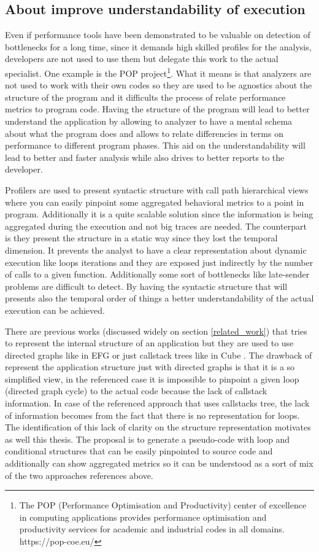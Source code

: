 \subsection{About improve understandability of execution}

Even if performance tools have been demonstrated to be valuable on detection of
bottlenecks for a long time, since it demands high skilled profiles for the
analysis, developers are not used to use them but delegate this work to the
actual specialist. One example is the POP project\footnote{The POP
  (Performance Optimisation and Productivity) center of excellence in computing
  applications provides performance optimisation and productivity services for
academic and industrial codes in all domains. https://pop-coe.eu/}. What it
means is that analyzers are not used to work with their own codes so they are used
to be agnostics about the structure of the program and it difficults the process
of relate performance metrics to program code. Having the structure of the
program will lead to better understand the application by allowing to analyzer
to have a mental schema about what the program does and allows to relate
differencies in terms on performance to different program phases. This aid on
the understandability will lead to better and faster analysis while also drives
to better reports to the developer.

Profilers are used to present syntactic structure with call path hierarchical 
views where
you can easily pinpoint some aggregated behavioral metrics to a point in
program. Additionally it is a quite scalable solution since the information is
being aggregated during the execution and not big traces are needed. The
counterpart is they present the structure in a static way since they
lost the temporal dimension. It prevents the analyst to have a clear
representation about dynamic execution like loops iterations and they are
exposed just indirectly by the number of calls to a given function. Additionally
some sort of bottlenecks like late-sender problems are difficult to detect. By 
having the syntactic structure that will presents also the temporal order of
things a better understandability of the actual execution can be achieved.

There are previous works (discussed widely on section \ref{related_work})  that 
tries to represent the internal structure of an application but they are used to
use directed graphs like in EFG \cite{aguilar2016event} or just callstack trees like
in Cube \cite{saviankou2015cube}. The drawback of represent the application structure
just with directed graphs is that it is a so simplified view, in the referenced
case it is impossible to pinpoint a given loop (directed graph cycle) to the
actual code because the lack of callstack information. In case of the
referenced approach that uses callstacks tree, the lack of information becomes
from the fact that there is no representation for loops. The identification of 
this lack of clarity
on the structure representation motivates as well this thesis. The proposal is to 
generate a pseudo-code with loop and conditional structures that can be easily 
pinpointed to source code and additionally can show aggregated metrics so it can 
be understood as a sort of mix of the two approaches references above.

